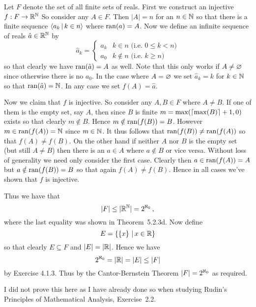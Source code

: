 \begin{solution}
	Let $F$ denote the set of all finite sets of reals.
    First we construct an injective $f: F \to \mathbb{R}^{\mathbb{N}}$
    So consider any $A \in F$.
    Then $|A|=n$ for an $n \in \mathbb{N}$ so that there is a finite sequence $\left\langle a_k \,|\, k \in n \right\rangle$ where $\mathrm{ran}(a) = A$.
    Now we define an infinite sequence of reals $\hat{a} \in \mathbb{R}^{\mathbb{N}}$ by
    $$
    \hat{a}_k = \begin{cases}
    	a_k & k \in n \,\, \text{(i.e. $0 \leq k < n$)} \\
        a_0 & k \notin n \,\, \text{(i.e. $k \geq n$)}
    \end{cases}
    $$
    so that clearly we have $\mathrm{ran}(\hat{a}) = A$ as well.
    Note that this only works if $A \neq \varnothing$ since otherwise there is no $a_0$.
    In the case  where $A = \varnothing$ we set $\hat{a}_k = k$ for $k \in \mathbb{N}$ so that $\mathrm{ran}(\hat{a}) = \mathbb{N}$.
    In any case we set $f(A) = \hat{a}$.

    Now we claim that $f$ is injective.
    So consider any $A,B \in F$ where $A \neq B$.
    If one of them is the empty set, say $A$, then since $B$ is finite $m = \max(\left\lceil \max(B) \right\rceil + 1, 0)$ exists so that clearly $m \notin B$.
    Hence $m \notin \mathrm{ran}(f(B)) = B$.
    However $m \in \mathrm{ran}(f(A)) = \mathbb{N}$ since $m \in \mathbb{N}$.
    It thus follows that $\mathrm{ran}(f(B)) \neq \mathrm{ran}(f(A))$ so that $f(A) \neq f(B)$.
    On the other hand if neither $A$ nor $B$ is the empty set (but still $A \neq B$) then there is an $a \in A$ where $a \notin B$ or vice versa.
    Without loss of generality we need only consider the first case.
    Clearly then $a \in \mathrm{ran}(f(A)) = A$ but $a \notin \mathrm{ran}(f(B)) = B$ so that again $f(A) \neq f(B)$.
    Hence in all cases we've shown that $f$ is injective.

    Thus we have that
    $$
    |F| \leq |\mathbb{R}^{\mathbb{N}}| = {2^{\aleph_0}} \,,
    $$
    where the last equality was shown in Theorem~5.2.3d.
    Now define
    $$
    E = \left\{ \left\{ x \right\} \,|\, x \in \mathbb{R} \right\}
    $$
    so that clearly $E \subseteq F$ and $|E| = |\mathbb{R}|$.
    Hence we have
    $$
    {2^{\aleph_0}} = |\mathbb{R}| = |E| \leq |F|
    $$
    by Exercise 4.1.3.
    Thus by the Cantor-Bernstein Theorem $|F| = {2^{\aleph_0}}$ as required. \qedsymbol
\end{solution}


\begin{solution}
	I did not prove this here as I have already done so when studying Rudin's Principles of Mathematical Analysis, Exercise~2.2.
\end{solution}

